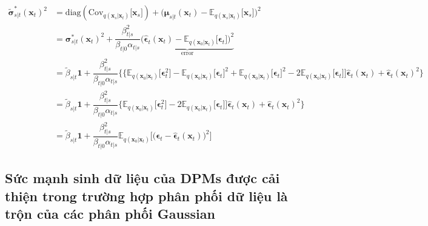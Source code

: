 \documentclass[14pt, a4paper]{article}
\numberwithin{equation}{section}
\numberwithin{figure}{section}
\numberwithin{dl}{section}
\numberwithin{md}{section}
\numberwithin{bd}{section}
\numberwithin{dn}{section}
\numberwithin{hq}{section}
\begin{document}
    \begin{equation}
        \begin{aligned}
            \tilde{\boldsymbol{\sigma}}_{s \vert t}^{\ast} (\boldsymbol{x}_t)^2 &= \mathrm{diag} (\mathrm{Cov}_{q(\boldsymbol{x}_s \vert \boldsymbol{x}_t)} \lbrack \boldsymbol{x}_s \rbrack) + \big(\boldsymbol{\mu}_{s \vert t} (\boldsymbol{x}_t) - \mathbb{E}_{q(\boldsymbol{x}_s \vert \boldsymbol{x}_t)} \lbrack \boldsymbol{x}_s \rbrack \big)^2 \\
            &= \boldsymbol{\sigma}_{s \vert t}^{\ast} (\boldsymbol{x}_t)^2 + \dfrac{\beta_{t \vert s}^2}{\beta_{t \vert 0} \alpha_{t \vert s}} \underbrace{\big( \hat{\boldsymbol{\epsilon}}_t (\boldsymbol{x}_t) - \mathbb{E}_{q(\boldsymbol{x}_0 \vert \boldsymbol{x}_t)} \lbrack \boldsymbol{\epsilon}_t \rbrack \big)^2}_{\mathrm{error}} \\
            &= \tilde{\beta}_{s \vert t} \boldsymbol{1} + \dfrac{\beta_{t \vert s}^2}{\beta_{t \vert 0} \alpha_{t \vert s}} \big \lbrace  \big \lbrace \mathbb{E}_{q(\boldsymbol{x}_0 \vert \boldsymbol{x}_t)} \lbrack \boldsymbol{\epsilon}_t^2 \rbrack - \mathbb{E}_{q(\boldsymbol{x}_0 \vert \boldsymbol{x}_t)} \lbrack \boldsymbol{\epsilon}_t \rbrack^2 + \mathbb{E}_{q(\boldsymbol{x}_0 \vert \boldsymbol{x}_t)} \lbrack \boldsymbol{\epsilon}_t \rbrack^2 - 2 \mathbb{E}_{q(\boldsymbol{x}_0 \vert \boldsymbol{x}_t)} \lbrack \boldsymbol{\epsilon}_t \rbrack \rbrack \hat{\boldsymbol{\epsilon}}_t (\boldsymbol{x}_t) + \hat{\boldsymbol{\epsilon}}_t (\boldsymbol{x}_t)^2 \big \rbrace \\
            &= \tilde{\beta}_{s \vert t} \boldsymbol{1} + \dfrac{\beta_{t \vert s}^2}{\beta_{t \vert 0} \alpha_{t \vert s}} \big \lbrace \mathbb{E}_{q(\boldsymbol{x}_0 \vert \boldsymbol{x}_t)} \lbrack \boldsymbol{\epsilon}_t^2 \rbrack - 2 \mathbb{E}_{q(\boldsymbol{x}_0 \vert \boldsymbol{x}_t)} \lbrack \boldsymbol{\epsilon}_t \rbrack \rbrack \hat{\boldsymbol{\epsilon}}_t (\boldsymbol{x}_t) + \hat{\boldsymbol{\epsilon}}_t(\boldsymbol{x}_t)^2 \big \rbrace \\
            &= \tilde{\beta}_{s \vert t} \boldsymbol{1} + \dfrac{\beta_{t \vert s}^2}{\beta_{t \vert 0} \alpha_{t \vert s}} \mathbb{E}_{q(\boldsymbol{x}_0 \vert \boldsymbol{x}_t)} \big \lbrack \big( \boldsymbol{\epsilon}_t - \hat{\boldsymbol{\epsilon}}_t (\boldsymbol{x}_t) \big)^2 \big \rbrack
        \end{aligned}
    \end{equation}

    \subsection{Sức mạnh sinh dữ liệu của DPMs được cải thiện trong trường hợp phân phối dữ liệu là trộn của các phân phối Gaussian}
\end{document}
